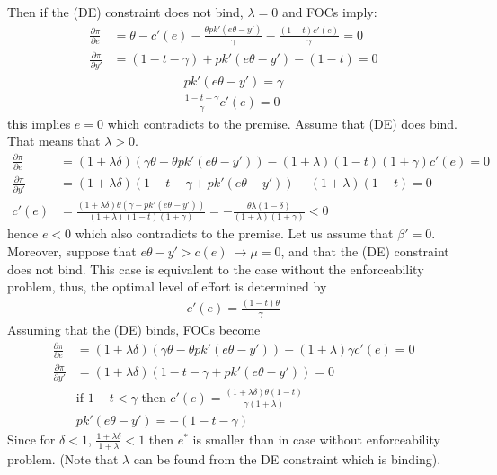 \documentclass[a4paper]{article}
\begin{document}
Then if the (DE) constraint does not bind, $\lambda = 0$ and FOCs imply:
\begin{align*}
\frac{\partial \pi}{\partial e}&=\theta - c'(e)- \frac{\theta p k'(e \theta - y')}{\gamma} - \frac{(1 - t)c'(e)}{\gamma}= 0\\
\frac{\partial \pi}{\partial y'} &= (1 - t - \gamma)+pk'(e\theta - y') - (1-t) = 0
\end{align*}
\begin{align*}
pk'(e\theta - y') = \gamma\\
\frac{1 - t + \gamma}{\gamma}c'(e) = 0
\end{align*}
this implies $e = 0$ which contradicts to the premise. Assume that (DE) does bind. That means that $\lambda > 0$.
\begin{align*}
\frac{\partial \pi}{\partial e} &= (1 + \lambda \delta)(\gamma \theta - \theta p k'(e \theta - y')) - (1+\lambda)(1-t)(1+\gamma) c'(e) = 0\\
\frac{\partial \pi}{\partial y'} &= (1+\lambda \delta)(1 - t - \gamma+pk'(e\theta - y')) - (1+\lambda)(1-t) = 0\\
c'(e) &= \frac{(1+\lambda \delta)\theta(\gamma - pk'(e \theta - y'))}{(1+\lambda)(1-t)(1+\gamma)} = -\frac{\theta\lambda(1-\delta)}{(1+\lambda)(1+\gamma)} < 0
\end{align*}
hence $e < 0$ which also contradicts to the premise. Let us assume that $\beta' = 0$. Moreover, suppose that $e \theta - y' > c(e)\ \to \mu = 0$, and that the (DE) constraint does not bind. This case is equivalent to the case without the enforceability problem, thus, the optimal level of effort is determined by
\begin{align*}
c'(e) = \frac{(1 - t)\theta}{\gamma}
\end{align*}
Assuming that the (DE) binds, FOCs become
\begin{align*}
\frac{\partial \pi}{\partial e} &= (1 + \lambda \delta)(\gamma \theta - \theta p k'(e \theta - y')) -(1+ \lambda) \gamma c'(e)= 0\\
\frac{\partial \pi}{\partial y'} &= (1 + \lambda \delta)(1 - t - \gamma+pk'(e\theta - y')) = 0\\
&\text{if }1-t < \gamma \text{ then }c'(e) = \frac{(1+\lambda \delta)\theta(1-t)}{\gamma (1 + \lambda)}\\
&pk'(e \theta - y') = -(1 - t - \gamma)
\end{align*}
Since for $\delta < 1$, $\frac{1+\lambda \delta}{1+\lambda} < 1$ then $e^*$ is smaller than in case without enforceability problem. (Note that $\lambda$ can be found from the DE constraint which is binding). 
\end{document}
